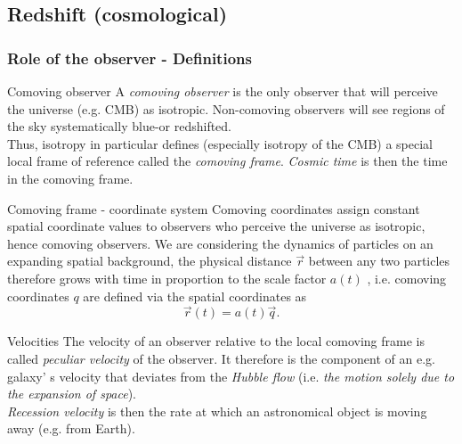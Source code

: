 \subsection{Redshift (cosmological)}
\subsubsection{Role of the observer - Definitions}
\begin{mybox}{Comoving observer}
	A \emph{comoving observer} is the only observer that will perceive the universe (e.g. CMB) as isotropic. Non-comoving observers will see regions of the sky systematically blue-or redshifted.\\
	Thus, isotropy in particular defines (especially isotropy of the CMB) a special local frame of reference called the \emph{comoving frame}.  \emph{Cosmic time} is then the time in the comoving frame.
\end{mybox}
\begin{mybox}{Comoving frame - coordinate system}
	Comoving coordinates assign constant spatial coordinate values to observers who perceive the universe as isotropic, hence comoving observers. We are considering the dynamics of particles
	on an expanding spatial background, the physical distance $\vec{r}$ between any two particles
	therefore grows with time in proportion to the scale factor $a ( t )$ , i.e. comoving coordinates $q$ are defined via the spatial coordinates as
	\begin{equation}
		\label{eq:comovingcoordinates}
		\vec{r}(t) = a(t) \vec{q}.
	\end{equation}
\end{mybox}
\begin{mybox}{Velocities}
	The velocity of an observer relative to the local comoving frame is called \emph{peculiar velocity} of the observer. It therefore is the component of an e.g. galaxy' s velocity that deviates from the \emph{Hubble flow} (i.e. \emph{the motion solely due to the expansion of space}). \\
	\emph{Recession velocity} is then the rate at which an astronomical object is moving away (e.g. from Earth).
\end{mybox}

